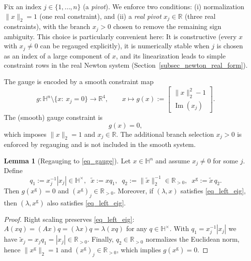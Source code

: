 \documentclass[preprint,12pt]{elsarticle}  %
\theoremstyle{definition}
\theoremstyle{definition}
\theoremstyle{definition}
\newtheorem{Lem}{Lemma}
\theoremstyle{definition}
\theoremstyle{definition}
\theoremstyle{remark}
\theoremstyle{remark}
\theoremstyle{remark}
\renewcommand{\Im}{\operatorname{Im}}
\newcommand{\RR}{\mathbb{R}}
\newcommand{\HH}{\mathbb{H}}
\begin{document}
Fix an index $j\in\{1,\dots,n\}$ (a \emph{pivot}). We enforce two conditions:
(i) normalization $\|x\|_2=1$ (one real constraint), and (ii) a \emph{real pivot} $x_j\in\RR$ (three real constraints), with the branch $x_j>0$ chosen to remove the remaining sign ambiguity. This choice is particularly convenient here:
It is constructive (every $x$ with $x_j\neq 0$ can be regauged explicitly), it is numerically stable when $j$ is chosen as an index of a large component of $x$, and its linearization leads to simple constraint rows in the real Newton system (Section~\ref{subsec_newton_real_form}).

The gauge is encoded by a smooth constraint map
\begin{equation}\label{eq0gauge}
g:\HH^n\setminus\{x:\ x_j=0\}\to\RR^4,
\qquad
x\mapsto g(x):=
\begin{bmatrix}
\|x\|_2^2-1\\[0.3mm]
\Im(x_j)
\end{bmatrix}.
\end{equation}
The (smooth) gauge constraint is
\begin{equation}
\label{eq_gauge}
g(x)=0,
\end{equation}
which imposes $\|x\|_2=1$ and $x_j\in\RR$. The additional branch selection $x_j>0$ is enforced by regauging
and is not included in the smooth system.

\begin{Lem}[Regauging to \eqref{eq_gauge}]
\label{lem_regauge}
Let $x\in\HH^n$ and assume $x_j\neq 0$ for some $j$.
Define
\[
q_1:=x_j^{-1}|x_j|\in\HH^\times,\;\; \tilde x:=x q_1,
\;\; q_2:=\|\tilde x\|_2^{-1}\in\RR_{>0},\;\; x^{\mathrm g}:=\tilde x\,q_2.
\]
Then $g(x^{\mathrm g})=0$ and $(x^{\mathrm g})_j\in\RR_{>0}$.
Moreover, if $(\lambda,x)$ satisfies \eqref{eq_left_eig}, then $(\lambda,x^{\mathrm g})$ also satisfies \eqref{eq_left_eig}.
\end{Lem}

\begin{proof}
Right scaling preserves \eqref{eq_left_eig}:
$A(xq)=(Ax)q=(\lambda x)q=\lambda(xq)$ for any $q\in\HH^\times$.
With $q_1=x_j^{-1}|x_j|$ we have $\tilde x_j=x_j q_1=|x_j|\in\RR_{>0}$.
Finally, $q_2\in\RR_{>0}$ normalizes the Euclidean norm, hence $\|x^{\mathrm g}\|_2=1$ and
$(x^{\mathrm g})_j\in\RR_{>0}$, which implies $g(x^{\mathrm g})=0$.
\end{proof}
\end{document}
